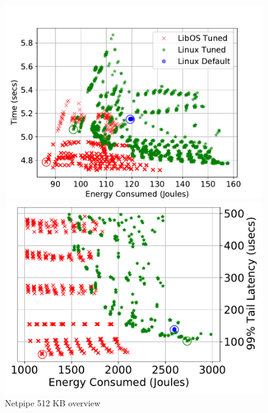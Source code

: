 %
\begin{figure}[thb]
\centering	
\begin{minipage}[t]{0.45\textwidth}
\includegraphics[width=\textwidth]{osdi_figures/netpipe_524288_overview.pdf}
	\caption{Netpipe 512 KB overview}
	\label{fig:netpipe8Kov}
\end{minipage}
\begin{minipage}[t]{0.45\textwidth}
	\includegraphics[width=\columnwidth]{osdi_figures/mcd_600000_overview.pdf}

\end{minipage}
\end{figure}
